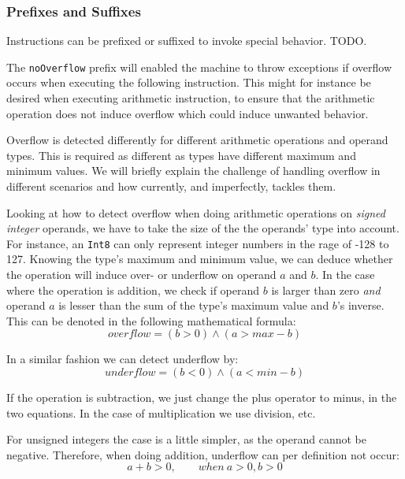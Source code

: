\subsubsection{Prefixes and Suffixes}

Instructions can be prefixed or suffixed to invoke special behavior. TODO.

The {\tt noOverflow} prefix will enabled the machine to throw exceptions if
overflow occurs when executing the following instruction. This might for
instance be desired when executing arithmetic instruction, to ensure that the
arithmetic operation does not induce overflow which could induce unwanted
behavior.

Overflow is detected differently for different arithmetic operations and operand
types. This is required as different as types have different maximum and minimum
values. We will briefly explain the challenge of handling overflow in different
scenarios and how \thename{} currently, and imperfectly, tackles them.

Looking at how to detect overflow when doing arithmetic operations on {\em
  signed integer} operands, we have to take the size of the the operands' type
into account. For instance, an {\tt Int8} can only represent integer numbers in
the rage of -128 to 127. Knowing the type's maximum and minimum value, we can
deduce whether the operation will induce over- or underflow on operand $a$ and
$b$. In the case where the operation is addition, we check if operand $b$ is
larger than zero {\em and} operand $a$ is lesser than the sum of the type's
maximum value and $b$'s inverse. This can be denoted in the following
mathematical formula:
\label{eq:overflow}
\begin{equation}
  overflow = (b > 0) \wedge (a > max - b)
\end{equation}

In a similar fashion we can detect underflow by:
\begin{equation}
  underflow = (b < 0) \wedge (a < min - b)
\end{equation}

If the operation is subtraction, we just change the plus operator to minus, in
the two equations. In the case of multiplication we use division, etc.

For unsigned integers the case is a little simpler, as the operand cannot be
negative. Therefore, when doing addition, underflow can per definition not
occur:
\begin{equation}
  a + b > 0, \qquad when\ a > 0, b > 0
\end{equation}

